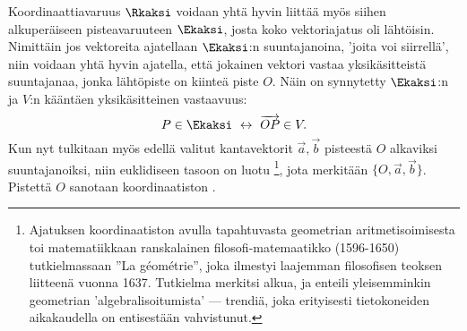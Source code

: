 Koordinaattiavaruus $\Rkaksi$ voidaan yhtä hyvin liittää myös siihen alkuperäiseen 
pisteavaruuteen $\Ekaksi$, josta koko vektoriajatus oli lähtöisin. Nimittäin jos vektoreita 
ajatellaan $\Ekaksi$:n suuntajanoina, 'joita voi siirrellä', niin voidaan yhtä hyvin ajatella,
että jokainen vektori vastaa yksikäsitteistä suuntajanaa, jonka lähtöpiste on kiinteä piste $O$.
Näin on synnytetty $\Ekaksi$:n ja $V$:n kääntäen yksikäsitteinen vastaavuus:
\[
P \in \Ekaksi \ \leftrightarrow \ \overrightarrow{OP} \in V.
\]
Kun nyt tulkitaan myös edellä valitut kantavektorit $\vec a, \vec b$ pisteestä $O$ alkaviksi
suuntajanoiksi, niin euklidiseen tasoon on luotu \footnote[2]{Ajatuksen 
koordinaatiston avulla tapahtuvasta geometrian aritmetisoimisesta toi matematiikkaan 
ranskalainen filosofi-matemaatikko  (1596-1650) tutkielmassaan 
''La g\'eom\'etrie'', joka ilmestyi laajemman filosofisen teoksen liitteenä vuonna 1637. 
Tutkielma merkitsi  alkua, ja enteili yleisemminkin geometrian 
'algebralisoitumista' --- trendiä, joka erityisesti tietokoneiden aikakaudella on entisestään
vahvistunut. }, jota merkitään $\{O,\vec a,\vec b\}$. Pistettä $O$
sanotaan koordinaatiston 
%
.

